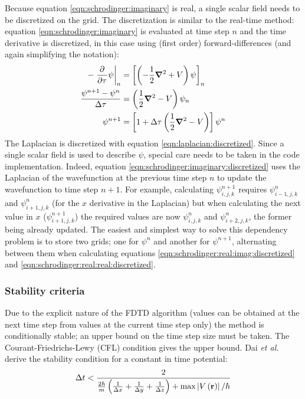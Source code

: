 Because equation \eqref{eqn:schrodinger:imaginary} is real, a single scalar
field needs to be discretized on the grid. The discretization is similar to the
real-time method: equation \eqref{eqn:schrodinger:imaginary} is evaluated at
time step $n$ and the time derivative is discretized, in this case using (first
order) forward-differences (and again simplifying the notation):
\begin{align}
- \left. \frac{\partial^{{}} }{\partial {\tau}^{{}}} \psi \right|_{n}
    & = \left[  \left( -\frac{1}{2} \bm{\nabla}^2 + V \right) \psi  \right]_{n}
\\
\frac{\psi^{n+1} - \psi^{n}}{\Delta \tau}
    & = \left( \frac{1}{2} \bm{\nabla}^2 - V \right) \psi_{n}
\\
\psi^{n+1} & = \left[ 1 + \Delta \tau \left( \frac{1}{2} \bm{\nabla}^2 - V \right) \right] \psi^{n}
\label{eqn:schrodinger:imaginary:discretized}
\end{align}
The Laplacian is discretized with equation \eqref{eqn:laplacian:discretized}.
Since a single scalar field is used to describe $\psi$, special care needs to
be taken in the code implementation. Indeed, equation
\eqref{eqn:schrodinger:imaginary:discretized} uses the Laplacian of the
wavefunction at the previous time step $n$ to update the wavefunction to
time step $n+1$. For example, calculating $\psi^{n+1}_{i,j,k}$ requires
$\psi^{n}_{i-1,j,k}$ and $\psi^{n}_{i+1,j,k}$ (for the $x$ derivative in the
Laplacian) but when calculating the next value in $x$ ($\psi^{n+1}_{i+1,j,k}$)
the required values are now $\psi^{n}_{i,j,k}$ and $\psi^{n}_{i+2,j,k}$, the
former being already updated. The easiest and simplest way to solve this
dependency problem is to store two grids; one for $\psi^{n}$ and another for
$\psi^{n+1}$, alternating between them when calculating equations
\eqref{eqn:schrodinger:real:imag:discretized} and
\eqref{eqn:schrodinger:real:real:discretized}.


\subsubsection{Stability criteria}

Due to the explicit nature of the FDTD algorithm (values can be obtained at the
next time step from values at the current time step only) the method is
conditionally stable; an upper bound on the time step size must be taken. The
Courant-Friedrichs-Lewy (CFL) condition gives the upper bound. Dai \textit{et
al.} derive\cite{Dai2005} the stability condition for a constant in time
potential:
\begin{align}
\Delta t < \frac{2}{
    \frac{2 \hbar}{m} \left( 
         \frac{1}{\Delta x}
        +\frac{1}{\Delta y}
        +\frac{1}{\Delta z}
         \right)
        + \textrm{max}\left| V\left( \textbf{r} \right) \right| / \hbar
    }
\end{align}



